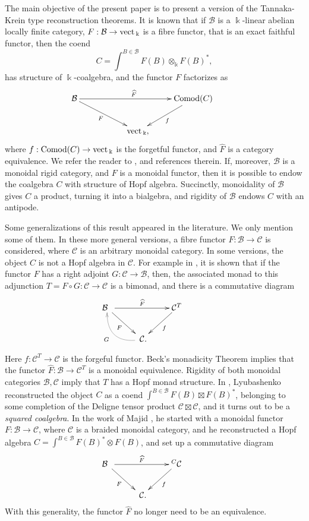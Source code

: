 \documentclass[11pt]{amsart}
\newcommand{\otk}{{\otimes_{\ku}}}
\newcommand{\uc}{f}
\newcommand{\ca}{{\mathcal C}}
\newcommand{\ot}{{\otimes}}
\newcommand{\vc}{{\mathcal C}}
\newcommand{\Bc}{{\mathcal B}}
\newcommand{\ku}{{\Bbbk}}
\newcommand{\vect}{\mbox{\rm vect\,}}
\renewcommand{\_}[1]{\mbox{$_{\left( #1 \right)}$}}
\theoremstyle{plain}
\numberwithin{equation}{section}
\theoremstyle{definition}
\theoremstyle{remark}
\theoremstyle{introTheorems}
\begin{document}
The main objective of the present paper is to present a version of the Tannaka-Krein type reconstruction theorems. It is known that if $\Bc$ is a $\ku$-linear abelian locally finite category, $F:\Bc\to \vect_\ku$ is a fibre functor, that is an exact faithful functor, then the coend
$$ C=\int^{B\in \Bc} F(B)\otk F(B)^*,$$
has structure of $\ku$-coalgebra, and the functor $F$ factorizes as 
\begin{equation*}
\xymatrix{
\Bc
\ar[rrr]^-{\qquad\widehat{F}}
\ar[drr]_-{F}
&&&
\mathrm{Comod}(C)
\ar[dl]^-{\uc}\ar@{}[d]|{}&\\
&&\vect_\ku,&
}
\end{equation*} 
where $f:\mathrm{Comod}(C)\to \vect_\ku$ is the forgetful functor, and $\widehat{F}$ is a category equivalence. We refer the reader to \cite{H}, \cite{PS} and references therein. 
If, moreover, $\Bc$ is a monoidal rigid category, and $F$ is a monoidal functor, then it is possible to endow the coalgebra $C$ with structure of Hopf algebra. Succinctly, monoidality of $\Bc$ gives $C$ a product, turning it into a bialgebra, and rigidity of $\Bc$ endows $C$ with an antipode. 

\medbreak

Some generalizations of this result appeared in the literature. We only mention some of them. In these more general versions, a fibre functor $F:\Bc\to \vc$ is considered, where $\vc$ is an arbitrary monoidal category. In some versions, the object $C$ is not a Hopf algebra in $\ca$. For example in \cite{BV},  it is shown that if the functor $F$ has a right adjoint $G:\ca\to \Bc$, then, the associated monad to this adjunction $T=F\circ G:\vc\to \vc$ is a bimonad, and there is a commutative diagram
\begin{equation*}
\vspace{.1cm}
\xymatrix{
\Bc\;\;
\ar[rr]^-{\widehat{F}}
\ar[dr]_-{F}
&&
\mathcal{C}^T
\ar[dl]^-{\uc}\ar@{}[d]|{}&\\
&\;\mathcal{C}.
\ar@/^1.5pc/@[gray][ul]^{G\;\;}&
}
\end{equation*} 

Here $f: \vc^T\to \vc$ is the forgeful functor. Beck's monadicity Theorem implies that the functor $\widehat{F}:\Bc\to \ca^T$ is a monoidal equivalence. Rigidity of both monoidal categories $\Bc, \vc$ imply that $T$ has a Hopf monad structure. In \cite{Li1}, \cite{Li2} Lyubashenko reconstructed the object $C$ as a coend $\int^{B\in \Bc} F(B)\boxtimes F(B)^*$, belonging to some completion of the Deligne tensor product $\vc \boxtimes \vc$, and it turns out to be a {\it squared coalgebra}. In the work of Majid \cite{Majid}, he started with a monoidal functor $F:\Bc\to \vc$, where $\vc$ is a braided monoidal category, and he reconstructed a Hopf algebra $C=\int^{B\in \Bc} F(B)^*\ot F(B)$, and set up a commutative diagram
\begin{equation*}
\vspace{.1cm}
\xymatrix{
\Bc\;\;
\ar[rr]^-{\widehat{F}}
\ar[dr]_-{F}
&&
{}^C\mathcal{C}
\ar[dl]^-{\uc}\ar@{}[d]|{}&\\
&\;\mathcal{C}.&
}
\end{equation*}
With this generality, the functor $\widehat{F}$ no longer need to be an equivalence.
\end{document}
